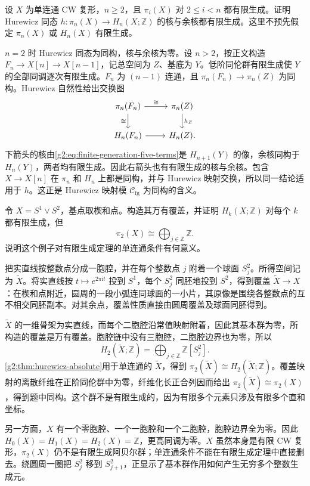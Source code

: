 \begin{exercise}\label{g2:ex:hurewicz-mod-finite-generation}
	设 \(X\) 为单连通 CW 复形，\(n\ge2\)，且 \(\pi_i(X)\) 对 \(2\le i<n\) 都有限生成。证明 Hurewicz 同态 \(h:\pi_n(X)\to H_n(X;\mathbb Z)\) 的核与余核都有限生成。这里不预先假定 \(\pi_n(X)\) 或 \(H_n(X)\) 有限生成。
\end{exercise}
\begin{solution}
	\(n=2\) 时 Hurewicz 同态为同构，核与余核为零。设 \(n>2\)，按正文构造 \(F_n\to X[n]\to X[n-1]\)，记总空间为 \(Z\)、基底为 \(Y\)。低阶同伦群有限生成使 \(Y\) 的全部同调逐次有限生成。\(F_n\) 为 \((n-1)\) 连通，且 \(\pi_n(F_n)\to\pi_n(Z)\) 为同构。Hurewicz 自然性给出交换图
	\[
		\begin{tikzcd}
			\pi_n(F_n)\arrow[r,"\cong"]\arrow[d,"\cong"']&\pi_n(Z)\arrow[d,"h_Z"]\\
			H_n(F_n)\arrow[r]&H_n(Z).
		\end{tikzcd}
	\]
	下箭头的核由\cref{g2:eq:finite-generation-five-terms}是 \(H_{n+1}(Y)\) 的像，余核同构于 \(H_n(Y)\)，两者均有限生成。因此右箭头也有有限生成的核与余核。包含 \(X\to X[n]\) 在 \(\pi_n\) 和 \(H_n\) 上都是同构，并与 Hurewicz 映射交换，所以同一结论适用于 \(h\)。这正是 Hurewicz 映射模 \(\mathcal C_{\mathrm{fg}}\) 为同构的含义。
\end{solution}

\begin{exercise}\label{g2:ex:finite-homology-infinite-pi-two}
	令 \(X=S^1\vee S^2\)，基点取楔和点。构造其万有覆盖，并证明 \(H_k(X;\mathbb Z)\) 对每个 \(k\) 都有限生成，但
	\[
		\pi_2(X)\cong\bigoplus_{j\in\mathbb Z}\mathbb Z.
	\]
	说明这个例子对有限生成定理的单连通条件有何意义。
\end{exercise}
\begin{solution}
	把实直线按整数点分成一胞腔，并在每个整数点 \(j\) 附着一个球面 \(S_j^2\)。所得空间记为 \(\widetilde X\)。将实直线按 \(t\mapsto e^{2\pi\mathrm it}\) 投到 \(S^1\)，每个 \(S_j^2\) 同胚地投到 \(S^2\)，得到覆盖 \(\widetilde X\rightarrow X\)：在楔和点附近，圆周的一段小弧连同球面的一小片，其原像是围绕各整数点的互不相交同胚副本。对其余点，覆盖性质直接由圆周覆盖及球面同胚得到。

	\(\widetilde X\) 的一维骨架为实直线，而每个二胞腔沿常值映射附着，因此其基本群为零，所构造的覆盖是万有覆盖。胞腔链中没有三胞腔，二胞腔边界也为零，所以
	\[
		H_2(\widetilde X;\mathbb Z)=\bigoplus_{j\in\mathbb Z}\mathbb Z[S_j^2].
	\]
	\cref{g2:thm:hurewicz-absolute}用于单连通的 \(\widetilde X\)，得到 \(\pi_2(\widetilde X)\cong H_2(\widetilde X;\mathbb Z)\)。覆盖映射的离散纤维在正阶同伦群中为零，纤维化长正合列因而给出 \(\pi_2(\widetilde X)\cong\pi_2(X)\)，得到题中同构。这个群不是有限生成的，因为有限多个元素只涉及有限多个直和坐标。

	另一方面，\(X\) 有一个零胞腔、一个一胞腔和一个二胞腔，胞腔边界全为零。因此 \(H_0(X)=H_1(X)=H_2(X)=\mathbb Z\)，更高同调为零。\(X\) 虽然本身是有限 CW 复形，\(\pi_2(X)\) 仍不是有限生成阿贝尔群；单连通条件不能在有限生成定理中直接删去。绕圆周一圈把 \(S_j^2\) 移到 \(S_{j+1}^2\)，正显示了基本群作用如何产生无穷多个整数生成元。
\end{solution}

